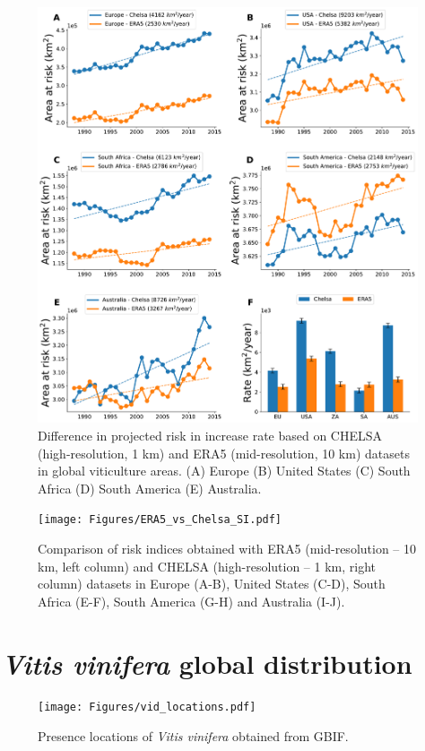 \begin{figure}[H]
    \centering
    \includegraphics[width=1\textwidth]{Figures/area_risk.pdf}
    \caption[Difference in the increase rate of projected risk for different
        resolutions of the climate data used]{Difference in projected risk in
        increase rate based
        on
        CHELSA
        (high-resolution, 1 km) and ERA5 (mid-resolution, 10 km) datasets in
        global
        viticulture areas. (A) Europe (B) United States (C) South Africa (D)
        South
        America (E) Australia.}
    \label{fig:area_at_risk}
\end{figure}

\begin{figure}[H]
    \centering
    \texttt{[image: Figures/ERA5\_vs\_Chelsa\_SI.pdf]}
    \caption[Comparison of risk indices for different
        resolutions of the climate data used]{Comparison of risk indices
        obtained
        with ERA5 (mid-resolution
        -- 10 km, left column) and CHELSA (high-resolution -- 1 km, right
        column)
        datasets in Europe (A-B), United States (C-D), South Africa (E-F),
        South
        America (G-H) and Australia (I-J).}
    \label{fig:ERA5_vs_chelsa}
\end{figure}

\section{\textit{Vitis vinifera} global distribution}

\begin{figure}[H]
    \centering
    \texttt{[image: Figures/vid\_locations.pdf]}
    \caption[Presence locations of \textit{Vitis vinifera} obtained from
        GBIF]{Presence locations of \textit{Vitis vinifera} obtained from
        GBIF.}
    \label{fig:vid_locations}
\end{figure}
